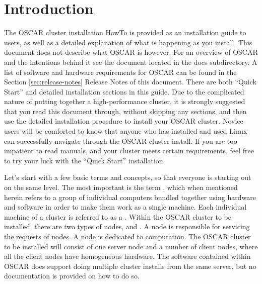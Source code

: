 %
%
%

\section{Introduction}

The OSCAR cluster installation HowTo is provided as an installation
guide to users, as well as a detailed explanation of what is happening
as you install. This document does not describe what OSCAR is however.
For an overview of OSCAR and the intentions behind it see the
 document located in the docs subdirectory.  \begchange
 A list of software and hardware requirements for OSCAR can be found in the Section 
\ref{sec:release-notes}  Release Notes of this document. \endchange
There are both ``Quick Start'' and detailed installation sections in this guide. Due
to the complicated nature of putting together a high-performance
cluster, it is strongly suggested that you read this document through,
without skipping any sections, and then use the detailed installation
procedure to install your OSCAR cluster.  Novice users will be
comforted to know that anyone who has installed and used Linux can
successfully navigate through the OSCAR cluster install.  If you are
too impatient to read manuals, and your cluster meets certain
requirements, feel free to try your luck with the ``Quick Start''
installation.

Let's start with a few basic terms and concepts, so that everyone is
starting out on the same level. The most important is the term
, which when mentioned herein refers to a group of
individual computers bundled together using hardware and software in
order to make them work as a single machine. Each individual machine
of a cluster is referred to as a . Within the OSCAR cluster
to be installed, there are two types of nodes,  and
. A  node is responsible for servicing the
requests of  nodes.  A  node is dedicated to
computation.  The OSCAR cluster to be installed will consist of one
server node and a number of client nodes, where all the client nodes
have homogeneous hardware.  The software contained within OSCAR does
support doing multiple cluster installs from the same server, but no
documentation is provided on how to do so.

